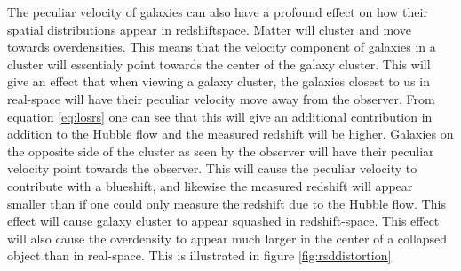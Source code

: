 The peculiar velocity of galaxies can also have a profound effect on how their
spatial distributions appear in redshiftspace. Matter will cluster and move
towards overdensities. This means that the velocity component of galaxies in a
cluster will essentialy point towards the center of the galaxy cluster. This
will give an effect that when viewing a galaxy cluster, the galaxies closest to
us in real-space will have their peculiar velocity move away from the observer.
From equation \ref{eq:losrs} one can see that this will give an additional
contribution in addition to the Hubble flow and the measured redshift will be
higher. Galaxies on the opposite side of the cluster as seen by the observer
will have their peculiar velocity point towards the observer. This will cause
the peculiar velocity to contribute with a blueshift, and likewise the measured
redshift will appear smaller than if one could only measure the redshift due to
the Hubble flow. This effect will cause galaxy cluster to appear squashed in
redshift-space. This effect will also cause the overdensity to appear much larger
in the center of a collapsed object than in real-space. This is illustrated in
figure \ref{fig:rsddistortion}\\

